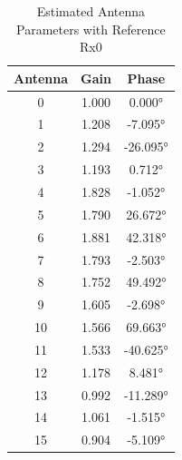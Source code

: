 \begin{table}[h]
\begin{subtable}[t]{0.4\textwidth}
    \end{subtable}
    \begin{subtable}[t]{0.4\textwidth}
        \begin{tabular}{ccc}
            \hline
            {Antenna} & {Gain} & {Phase}  \\
            \hline
            0         & 1.000  & 0.000°   \\
            1         & 1.208  & -7.095°  \\
            2         & 1.294  & -26.095° \\
            3         & 1.193  & 0.712°   \\
            4         & 1.828  & -1.052°  \\
            5         & 1.790  & 26.672°  \\
            6         & 1.881  & 42.318°  \\
            7         & 1.793  & -2.503°  \\
            8         & 1.752  & 49.492°  \\
            9         & 1.605  & -2.698°  \\
            10        & 1.566  & 69.663°  \\
            11        & 1.533  & -40.625° \\
            12        & 1.178  & 8.481°   \\
            13        & 0.992  & -11.289° \\
            14        & 1.061  & -1.515°  \\
            15        & 0.904  & -5.109°  \\
            \hline
        \end{tabular}
        \label{tab:rx_gains}
    \end{subtable}
    \caption{Estimated Antenna Parameters with Reference Rx0}
\end{table}

